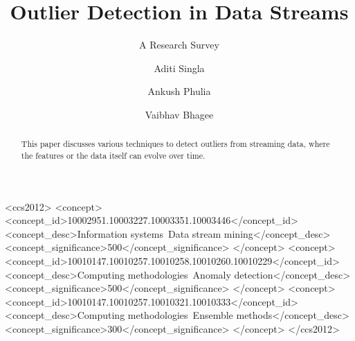\documentclass[sigconf]{acmart}
\begin{document}
\title{Outlier Detection in Data Streams}
\subtitle{A Research Survey}


\author{Aditi Singla}

\author{Ankush Phulia}

\author{Vaibhav Bhagee}



\begin{abstract}
This paper discusses various techniques to detect outliers from
streaming data, where the features or the data itself can evolve
over time.
\end{abstract}

%
%
 \begin{CCSXML}
<ccs2012>
<concept>
<concept_id>10002951.10003227.10003351.10003446</concept_id>
<concept_desc>Information systems~Data stream mining</concept_desc>
<concept_significance>500</concept_significance>
</concept>
<concept>
<concept_id>10010147.10010257.10010258.10010260.10010229</concept_id>
<concept_desc>Computing methodologies~Anomaly detection</concept_desc>
<concept_significance>500</concept_significance>
</concept>
<concept>
<concept_id>10010147.10010257.10010321.10010333</concept_id>
<concept_desc>Computing methodologies~Ensemble methods</concept_desc>
<concept_significance>300</concept_significance>
</concept>
</ccs2012>
\end{CCSXML}





\maketitle





\end{document}
